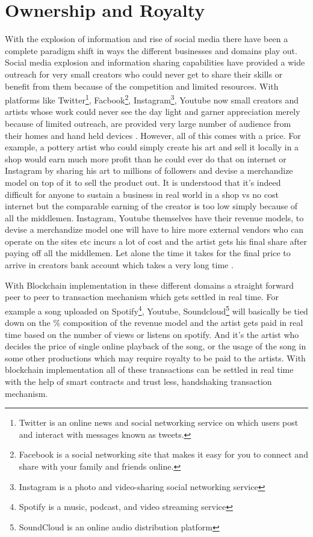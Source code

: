 \section{Ownership and Royalty}
With the explosion of information and rise of social media there have been a complete paradigm shift in ways the different businesses and domains play out. Social media explosion and information sharing capabilities have provided a wide outreach for very small creators who could never get to share their skills or benefit from them because of the competition and limited resources. With platforms like Twitter\footnote{Twitter is an online news and social networking service on which users post and interact with messages known as tweets.}, Facbook\footnote{Facebook is a social networking site that makes it easy for you to connect and share with your family and friends online.}, Instagram\footnote{Instagram is a photo and video-sharing social networking service}, Youtube now small creators and artists whose work could never see the day light and garner appreciation merely because of limited outreach, are provided very large number of audience from their homes and hand held devices \cite{saleem24}. However, all of this comes with a price. For example, a pottery artist who could simply create his art and sell it locally in a shop would earn much more profit than he could ever do that on internet or Instagram by sharing his art to millions of followers and devise a merchandize model on top of it to sell the product out. It is understood that it's indeed difficult for anyone to sustain a business in real world in a shop vs no cost internet but the comparable earning of the creator is too low simply because of all the middlemen. Instagram, Youtube themselves have their revenue models, to devise a merchandize model one will have to hire more external vendors who can operate on the sites etc incurs a lot of cost and the artist gets his final share after paying off all the middlemen. Let alone the time it takes for the final price to arrive in creators bank account which takes a very long time \cite{margaret25}.

With Blockchain implementation in these different domains a straight forward peer to peer to transaction mechanism which gets settled in real time. For example a song uploaded on Spotify\footnote{Spotify is a music, podcast, and video streaming service}, Youtube, Soundcloud\footnote{SoundCloud is an online audio distribution platform} will basically be tied down on the \% composition of the revenue model and the artist gets paid in real time based on the number of views or listens on spotify. And it's the artist who decides the price of single online playback of the song, or the usage of the song in some other productions which may require royalty to be paid to the artists. With blockchain implementation all of these transactions can be settled in real time with the help of smart contracts and trust less, handshaking transaction mechanism.


